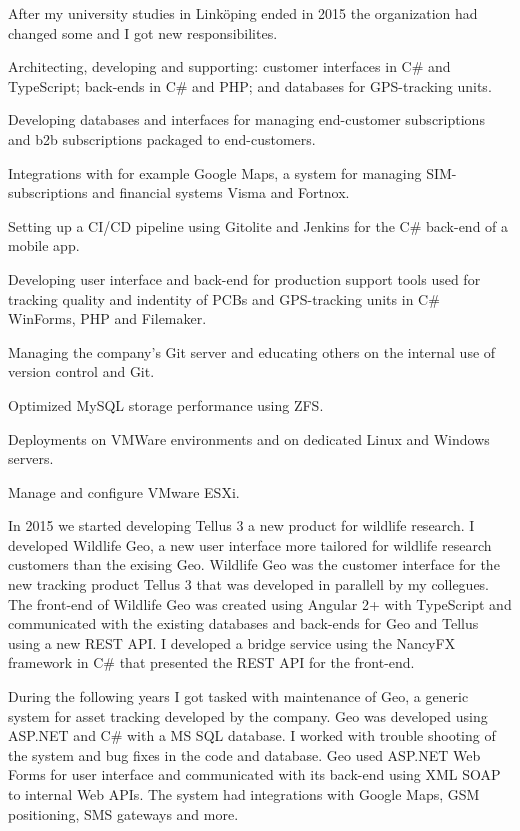 \documentclass{cv-stylish}
\begin{document}
\begin{center}
\begin{InfoBody}
After my university studies in Linköping ended in 2015 the organization
had changed some and I got new responsibilites.

\begin{compactitem}
  \item Architecting, developing and supporting: customer interfaces in
    C\# and TypeScript; back-ends in C\# and PHP; and databases for
    GPS-tracking units.
  \item Developing databases and interfaces for managing end-customer
    subscriptions and b2b subscriptions packaged to end-customers.
  \item Integrations with for example Google Maps, a system for managing
    SIM-subscriptions and financial systems Visma and Fortnox.
  \item Setting up a CI/CD pipeline using Gitolite and Jenkins for the C\#
    back-end of a mobile app.
  \item Developing user interface and back-end for production support
    tools used for tracking quality and indentity of PCBs and GPS-tracking
    units in C\# WinForms, PHP and Filemaker.
  \item Managing the company's Git server and educating others on the
    internal use of version control and Git.
  \item Optimized MySQL storage performance using ZFS.
  \item Deployments on VMWare environments and on dedicated Linux and
    Windows servers.
  \item Manage and configure VMware ESXi.
\end{compactitem}

In 2015 we started developing Tellus 3 a new product for wildlife
research. I developed Wildlife Geo, a new user interface more tailored
for wildlife research customers than the exising Geo.
Wildlife Geo was the customer interface for the new tracking product
Tellus 3 that was developed in parallell by my collegues.
The front-end of Wildlife Geo was created using Angular 2+ with
TypeScript and communicated with the existing databases and back-ends
for Geo and Tellus using a new REST API. I developed a bridge service
using the NancyFX framework in C\# that presented the REST API for the
front-end.

During the following years I got tasked with maintenance of Geo, a
generic system for asset tracking developed by the company.
Geo was developed using ASP.NET and C\# with a MS SQL database.
I worked with trouble shooting of the system and bug fixes in the code
and database.
Geo used ASP.NET Web Forms for user interface and communicated with
its back-end using XML SOAP to internal Web APIs. The system had
integrations with Google Maps, GSM positioning, SMS gateways and
more.


\end{InfoBody}
\end{center}
\end{document}
